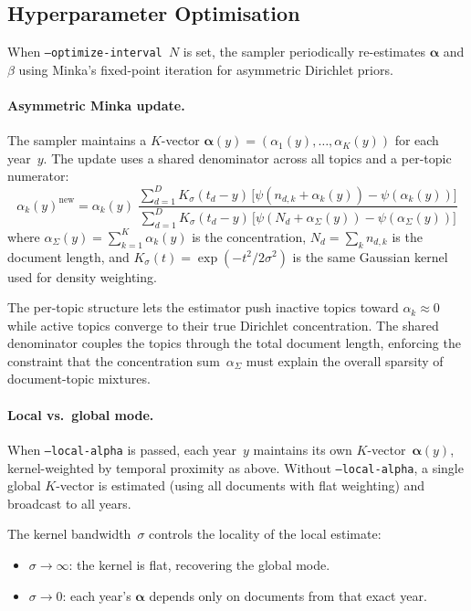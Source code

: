 \documentclass[11pt]{article}
\begin{document}
\subsection{Hyperparameter Optimisation}

When \texttt{--optimize-interval $N$} is set, the sampler periodically re-estimates $\boldsymbol\alpha$ and $\beta$ using Minka's fixed-point iteration for asymmetric Dirichlet priors.

\paragraph{Asymmetric Minka update.}
The sampler maintains a $K$-vector $\boldsymbol\alpha(y) = (\alpha_1(y),\ldots,\alpha_K(y))$ for each year~$y$.
The update uses a shared denominator across all topics and a per-topic numerator:
\[
\alpha_k(y)^{\text{new}}
  = \alpha_k(y)\;
    \frac{\displaystyle\sum_{d=1}^{D} K_\sigma(t_d - y)\,
          \bigl[\psi(n_{d,k}+\alpha_k(y))-\psi(\alpha_k(y))\bigr]}
         {\displaystyle\sum_{d=1}^{D} K_\sigma(t_d - y)\,
          \bigl[\psi(N_d+\alpha_{\Sigma}(y))-\psi(\alpha_{\Sigma}(y))\bigr]}
\]
where $\alpha_{\Sigma}(y) = \sum_{k=1}^K \alpha_k(y)$ is the concentration,
$N_d = \sum_k n_{d,k}$ is the document length,
and $K_\sigma(t) = \exp(-t^2/2\sigma^2)$ is the same Gaussian kernel used for density weighting.

The per-topic structure lets the estimator push inactive topics toward $\alpha_k \approx 0$ while active topics converge to their true Dirichlet concentration.
The shared denominator couples the topics through the total document length, enforcing the constraint that the concentration sum~$\alpha_\Sigma$ must explain the overall sparsity of document-topic mixtures.

\paragraph{Local vs.\ global mode.}
When \texttt{--local-alpha} is passed, each year~$y$ maintains its own $K$-vector~$\boldsymbol\alpha(y)$, kernel-weighted by temporal proximity as above.
Without \texttt{--local-alpha}, a single global $K$-vector is estimated (using all documents with flat weighting) and broadcast to all years.

The kernel bandwidth~$\sigma$ controls the locality of the local estimate:
\begin{itemize}
\item $\sigma \to \infty$: the kernel is flat, recovering the global mode.
\item $\sigma \to 0$: each year's $\boldsymbol\alpha$ depends only on documents from that exact year.
\end{itemize}
\end{document}
